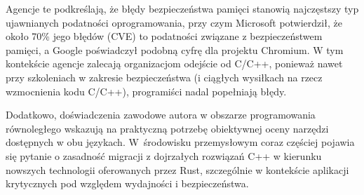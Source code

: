 Agencje te podkreślają, że błędy bezpieczeństwa pamięci stanowią najczęstszy typ ujawnianych podatności oprogramowania, przy czym Microsoft potwierdził, że około 70\% jego błędów (CVE) to podatności związane z bezpieczeństwem pamięci, a Google poświadczył podobną cyfrę dla projektu Chromium. W tym kontekście agencje zalecają organizacjom odejście od C/C++, ponieważ nawet przy szkoleniach w zakresie bezpieczeństwa (i ciągłych wysiłkach na rzecz wzmocnienia kodu C/C++), programiści nadal popełniają błędy.

Dodatkowo, doświadczenia zawodowe autora w obszarze programowania równoległego wskazują na praktyczną potrzebę obiektywnej oceny narzędzi dostępnych w obu językach. W~środowisku przemysłowym coraz częściej pojawia się pytanie o zasadność migracji z dojrzałych rozwiązań C++ w kierunku nowszych technologii oferowanych przez Rust, szczególnie w kontekście aplikacji krytycznych pod względem wydajności i bezpieczeństwa.

